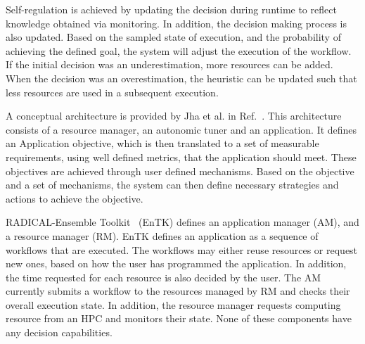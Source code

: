Self-regulation is achieved by updating the decision during runtime to reflect 
knowledge obtained via monitoring. In addition, the decision making process is 
also updated. Based on the sampled state of execution, and the probability of 
achieving the defined goal, the system will adjust the execution of the 
workflow. If the initial decision was an underestimation, more resources can be 
added. When the decision was an overestimation, the heuristic can be updated 
such that less resources are used in a subsequent execution.


A conceptual architecture is provided by Jha et al. in Ref.~\cite{jha2009self}. 
This architecture consists of a resource manager, an autonomic tuner and an 
application. It defines an Application objective, which is then translated to a 
set of measurable requirements, using well defined metrics, that the 
application should meet. These objectives are achieved through user defined 
mechanisms. Based on the objective and a set of mechanisms, the system can then 
define necessary strategies and actions to achieve the objective.

RADICAL-Ensemble Toolkit~\cite{balasubramanian2018harnessing} (EnTK) defines an 
application manager (AM), and a resource manager (RM). EnTK defines an 
application as a sequence of workflows that are executed. The workflows may 
either reuse resources or request new ones, based on how the user has 
programmed the application. In addition, the time requested for each resource 
is also decided by the user. The AM currently submits a workflow to the 
resources managed by RM and checks their overall execution state. In addition, 
the resource manager requests computing resource from an HPC and monitors their 
state. None of these components have any decision capabilities.

